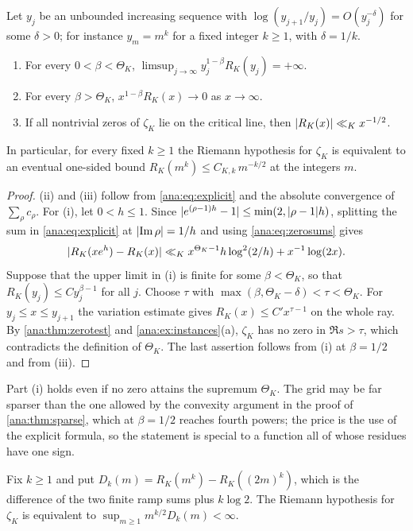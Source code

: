 \begin{theorem}\label{ana:thm:powers}
Let $y_j$ be an unbounded increasing sequence with $\log(y_{j+1}/y_j)=O(y_j^{-\delta})$ for
some $\delta>0$; for instance $y_m=m^k$ for a fixed integer $k\ge1$, with $\delta=1/k$.
\begin{enumerate}[label=\textup{(\roman*)}]
\item For every $0<\beta<\Theta_K$,
 $\limsup_{j\to\infty}y_j^{1-\beta}R_K(y_j)=+\infty$.
\item For every $\beta>\Theta_K$, $x^{1-\beta}R_K(x)\to0$ as $x\to\infty$.
\item If all nontrivial zeros of $\zeta_K$ lie on the critical line, then
 $\lvert R_K(x)\rvert\ll_Kx^{-1/2}$.
\end{enumerate}
In particular, for every fixed $k\ge1$ the Riemann hypothesis for $\zeta_K$ is equivalent to
an eventual one-sided bound $R_K(m^k)\le C_{K,k}\,m^{-k/2}$ at the integers $m$.
\end{theorem}

\begin{proof}
(ii) and (iii) follow from \eqref{ana:eq:explicit} and the absolute convergence of
$\sum_\rho c_\rho$. For (i), let $0<h\le1$. Since
$\lvert e^{(\rho-1)h}-1\rvert\le\min(2,\lvert\rho-1\rvert h)$, splitting the sum in \eqref{ana:eq:explicit}
at $\lvert\operatorname{Im}\rho\rvert=1/h$ and using \eqref{ana:eq:zerosums} gives
\[
 \lvert R_K(xe^h)-R_K(x)\rvert\ll_Kx^{\Theta_K-1}h\log^2(2/h)+x^{-1}\log(2x).
\]
Suppose that the upper limit in (i) is finite for some $\beta<\Theta_K$, so that
$R_K(y_j)\le Cy_j^{\beta-1}$ for all $j$. Choose $\tau$ with
$\max(\beta,\Theta_K-\delta)<\tau<\Theta_K$. For $y_j\le x\le y_{j+1}$ the variation estimate
gives $R_K(x)\le C'x^{\tau-1}$ on the whole ray. By \cref{ana:thm:zerotest} and
\cref{ana:ex:instances}(a), $\zeta_K$ has no zero in $\Re s>\tau$, which contradicts the
definition of $\Theta_K$. The last assertion follows from (i) at $\beta=1/2$ and from (iii).
\end{proof}

Part (i) holds even if no zero attains the supremum $\Theta_K$. The grid may be far sparser
than the one allowed by the convexity argument in the proof of \cref{ana:thm:sparse}, which
at $\beta=1/2$ reaches fourth powers; the price is the use of the explicit formula, so the
statement is special to a function all of whose residues have one sign.

\begin{corollary}\label{ana:cor:finite}
Fix $k\ge1$ and put $D_k(m)=R_K(m^k)-R_K((2m)^k)$, which is the difference of the two finite
ramp sums plus $k\log2$. The Riemann hypothesis for $\zeta_K$ is equivalent to
$\sup_{m\ge1}m^{k/2}D_k(m)<\infty$.
\end{corollary}

